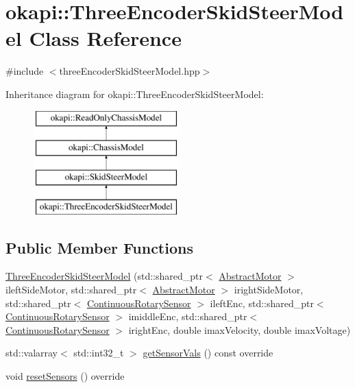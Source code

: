 \hypertarget{classokapi_1_1ThreeEncoderSkidSteerModel}{}\section{okapi\+::Three\+Encoder\+Skid\+Steer\+Model Class Reference}
\label{classokapi_1_1ThreeEncoderSkidSteerModel}


{\ttfamily \#include $<$three\+Encoder\+Skid\+Steer\+Model.\+hpp$>$}

Inheritance diagram for okapi\+::Three\+Encoder\+Skid\+Steer\+Model\+:\begin{figure}[H]
\begin{center}
\leavevmode
\includegraphics[height=4.000000cm]{classokapi_1_1ThreeEncoderSkidSteerModel}
\end{center}
\end{figure}
\subsection*{Public Member Functions}
\begin{DoxyCompactItemize}
\item 
\mbox{\hyperlink{classokapi_1_1ThreeEncoderSkidSteerModel_a27ca581fa9c5f43168d9f52e3dba8d74}{Three\+Encoder\+Skid\+Steer\+Model}} (std\+::shared\+\_\+ptr$<$ \mbox{\hyperlink{classokapi_1_1AbstractMotor}{Abstract\+Motor}} $>$ ileft\+Side\+Motor, std\+::shared\+\_\+ptr$<$ \mbox{\hyperlink{classokapi_1_1AbstractMotor}{Abstract\+Motor}} $>$ iright\+Side\+Motor, std\+::shared\+\_\+ptr$<$ \mbox{\hyperlink{classokapi_1_1ContinuousRotarySensor}{Continuous\+Rotary\+Sensor}} $>$ ileft\+Enc, std\+::shared\+\_\+ptr$<$ \mbox{\hyperlink{classokapi_1_1ContinuousRotarySensor}{Continuous\+Rotary\+Sensor}} $>$ imiddle\+Enc, std\+::shared\+\_\+ptr$<$ \mbox{\hyperlink{classokapi_1_1ContinuousRotarySensor}{Continuous\+Rotary\+Sensor}} $>$ iright\+Enc, double imax\+Velocity, double imax\+Voltage)
\item 
std\+::valarray$<$ std\+::int32\+\_\+t $>$ \mbox{\hyperlink{classokapi_1_1ThreeEncoderSkidSteerModel_a39af35aa25e5385584b3834911aed341}{get\+Sensor\+Vals}} () const override
\item 
void \mbox{\hyperlink{classokapi_1_1ThreeEncoderSkidSteerModel_a6e4d43a1f3027798c0451c93f8cde057}{reset\+Sensors}} () override
\end{DoxyCompactItemize}
